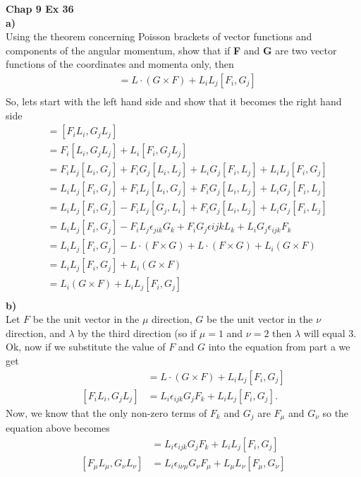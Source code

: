 \documentclass[10pt]{article}
\begin{document}
\textbf{Chap 9 Ex 36}\\
\textbf{a)}\\
Using the theorem concerning Poisson brackets of vector functions and components
of the angular momentum, show that if \textbf{F} and \textbf{G} are two vector
functions of the coordinates and momenta only, then
\begin{align*}
  [F\cdot L,G\cdot L] &= L\cdot(G\times F)+L_iL_j[F_i,G_j]\\
\end{align*}
So, lets start with the left hand side and show that it becomes the right hand
side
\begin{align*}
  [F\cdot L,G\cdot L] &= [F_iL_i,G_jL_j]\\
                      &= F_i[L_i,G_jL_j] + L_i[F_i,G_jL_j]\\
                      &= F_iL_j[L_i,G_j] + F_iG_j[L_i,L_j] + L_iG_j[F_i,L_j] + L_iL_j[F_i,G_j]\\
                      &= L_iL_j[F_i,G_j] + F_iL_j[L_i,G_j] + F_iG_j[L_i,L_j] + L_iG_j[F_i,L_j]\\
                      &= L_iL_j[F_i,G_j] - F_iL_j[G_j,L_i] + F_iG_j[L_i,L_j] + L_iG_j[F_i,L_j]\\
                      &= L_iL_j[F_i,G_j] - F_iL_j\epsilon_{jik}G_k + F_iG_j\epsilon{ijk}L_k + L_iG_j\epsilon_{ijk}F_k\\
                      &= L_iL_j[F_i,G_j] - L\cdot(F\times G) + L\cdot(F\times G) + L_i(G\times F)\\
                      &= L_iL_j[F_i,G_j] + L_i(G\times F)\\
                      &= L_i(G\times F) + L_iL_j[F_i,G_j]\\
\end{align*}
\textbf{b)}\\
Let $F$ be the unit vector in the $\mu$ direction, $G$ be the unit vector in the $\nu$ direction, and $\lambda$ by the third direction (so if $\mu=1$ and $\nu=2$ then $\lambda$ will equal 3.  Ok,
now if we substitute the value of $F$ and $G$ into the equation from part a we get
\begin{align*}
  [F\cdot L,G\cdot L] &= L\cdot(G\times F)+L_iL_j[F_i,G_j]\\
  [F_iL_i,G_jL_j]     &= L_i\epsilon_{ijk}G_jF_k+L_iL_j[F_i,G_j].
\end{align*}
Now, we know that the only non-zero terms of $F_k$ and $G_j$ are $F_{\mu}$ and $G_{\nu}$ so the equation above becomes
\begin{align*}
  [F_iL_i,G_jL_j] &= L_i\epsilon_{ijk}G_jF_k+L_iL_j[F_i,G_j]\\
  [F_{\mu}L_{\mu},G_{\nu}L_{\nu}] &= L_i\epsilon_{i\nu\mu}G_{\nu}F_{\mu}+L_{\mu}L_{\nu}[F_{\mu},G_{\nu}]\\
\end{align*}
\end{document}
